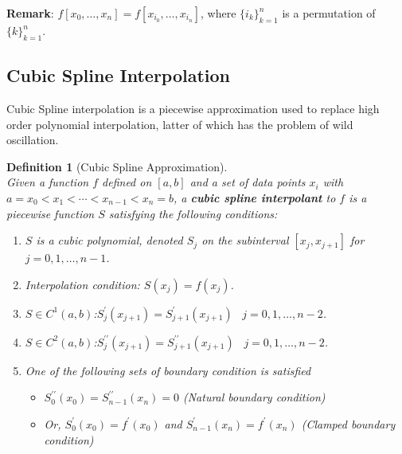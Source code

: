 \documentclass[12pt]{article}
\newtheorem{definition}{Definition}[section]
\theoremstyle{definition}
\begin{document}
\textbf{Remark}: $f[x_0,\ldots,x_n] = f[x_{i_0},\ldots, x_{i_n}]$, where $\{i_k\}_{k=1}^n$ is a permutation of $\{k\}_{k=1}^n$.
\subsection{Cubic Spline Interpolation}
Cubic Spline interpolation is a piecewise approximation used to replace high order polynomial interpolation, latter of which has the problem of wild oscillation.
\begin{definition}[Cubic Spline Approximation]
\hfill\\\normalfont Given a function $f$ defined on $[a,b]$ and a set of data points $x_i$ with $a=x_0<x_1<\cdots<x_{n-1}<x_n=b$, a \textbf{cubic spline interpolant} to $f$ is a \textit{piecewise} function $S$ satisfying the following conditions:
\begin{enumerate}
  \item $S$ is a cubic polynomial, denoted $S_j$ on the subinterval $[x_j,x_{j+1}]$ for $j = 0,1,\ldots, n-1$.
  \item Interpolation condition: $S(x_j) = f(x_j)$.
  \item $S\in C^1(a,b)$:$S^\prime_j(x_{j+1}) = S^\prime_{j+1}(x_{j+1})\;\;\;j = 0,1,\ldots, n-2$.
  \item $S\in C^2(a,b)$:$S^{\prime\prime}_j(x_{j+1}) = S^{\prime\prime}_{j+1}(x_{j+1})\;\;\;j = 0,1,\ldots, n-2$.
  \item One of the following sets of boundary condition is satisfied
  \begin{itemize}
    \item $S_0^{\prime\prime}(x_0)=S_{n-1}^{\prime\prime}(x_n)=0$ (Natural boundary condition)
    \item Or, $S_0^\prime(x_0) = f^\prime(x_0)$ and $S_{n-1}^\prime(x_n)= f^\prime(x_n)$ (Clamped boundary condition)
  \end{itemize}
\end{enumerate}
\end{definition}
\end{document}
